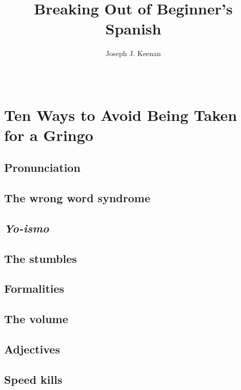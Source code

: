 
\usepackage[hidelinks]{hyperref}



\frontmatter

\begin{titlingpage}
\title{Breaking Out of Beginner's Spanish}
\author{Joseph J. Keenan}
\date{~}
\maketitle
\end{titlingpage}

\tableofcontents*

\mainmatter

\chapter{Ten Ways to Avoid Being Taken for a Gringo}

\section{Pronunciation}
\section{The wrong word syndrome}
\section{\textit{Yo-ismo}}
\section{The stumbles}
\section{Formalities}
\section{The volume}
\section{Adjectives}
\section{Speed kills}
